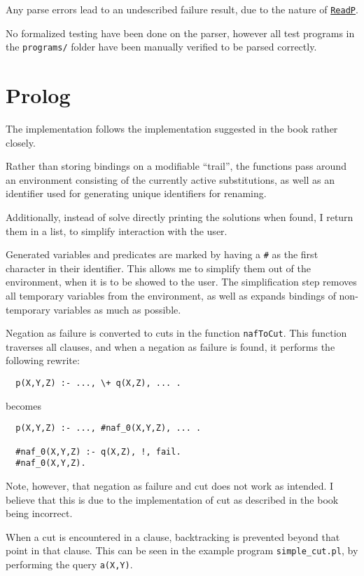 \documentclass[11pt,a4paper]{article}
\newcommand{\hoogle}[1]{\href{http://www.haskell.org/hoogle/?hoogle=#1}{\texttt{#1}}}
\begin{document}
Any parse errors lead to an undescribed failure result, due to the nature of
\hoogle{ReadP}.

No formalized testing have been done on the parser, however all test programs
in the \texttt{programs/} folder have been manually verified to be parsed
correctly.

\section{Prolog}
The implementation follows the implementation suggested in the book rather closely.

Rather than storing bindings on a modifiable ``trail'', the functions pass
around an environment consisting of the currently active substitutions, as
well as an identifier used for generating unique identifiers for renaming.

Additionally, instead of solve directly printing the solutions when found,
I return them in a list, to simplify interaction with the user.

Generated variables and predicates are marked by having a \texttt{\#} as the
first character in their identifier. This allows me to simplify them out of
the environment, when it is to be showed to the user. The simplification step
removes all temporary variables from the environment, as well as expands
bindings of non-temporary variables as much as possible.

Negation as failure is converted to cuts in the function \texttt{nafToCut}.
This function traverses all clauses, and when a negation as failure is found, it
performs the following rewrite:

\begin{verbatim}
  p(X,Y,Z) :- ..., \+ q(X,Z), ... .
\end{verbatim}

becomes

\begin{verbatim}
  p(X,Y,Z) :- ..., #naf_0(X,Y,Z), ... .

  #naf_0(X,Y,Z) :- q(X,Z), !, fail.
  #naf_0(X,Y,Z).
\end{verbatim}

Note, however, that negation as failure and cut does not work as intended. I
believe that this is due to the implementation of cut as described in the book
being incorrect.

When a cut is encountered in a clause, backtracking is prevented beyond that point
in that clause. This can be seen in the example program \texttt{simple\_cut.pl}, by
performing the query \texttt{a(X,Y)}.
\end{document}
